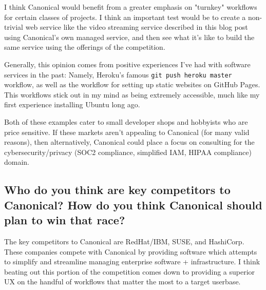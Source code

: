 \documentclass{article}
\begin{document}
I think Canonical would benefit from a greater emphasis on "turnkey" workflows
for certain classes of projects. I think an important test would be to create a non-trivial
web service like the video streaming service described in this blog
post\cite{streaming_blog} using Canonical's own managed service, and then see
what it's like to build the same service using the offerings of the competition.

Generally, this opinion comes from positive experiences I've had with software
services in the past: Namely, Heroku's famous \texttt{git push heroku master}
workflow, as well as the workflow for setting up static websites on GitHub Pages.
This workflows stick out in my mind as being extremely accessible, much like my
first experience installing Ubuntu long ago.

Both of these examples cater to small developer shops and hobbyists who
are price sensitive. If these markets aren't appealing to Canonical (for
many valid reasons), then alternatively, Canonical could place a focus
on consulting for the cybersecurity/privacy (SOC2 compliance, simplified IAM, HIPAA compliance)
domain.


\subsection{Who do you think are key competitors to Canonical? How do you think
  Canonical should plan to win that race?}

The key competitors to Canonical are RedHat/IBM, SUSE, and HashiCorp. These
companies compete with Canonical by providing software which attempts to
simplify and streamline managing enterprise software + infrastructure. I think
beating out this portion of the competition comes down to providing a superior
UX on the handful of workflows that matter the most to a target userbase.




\end{document}

